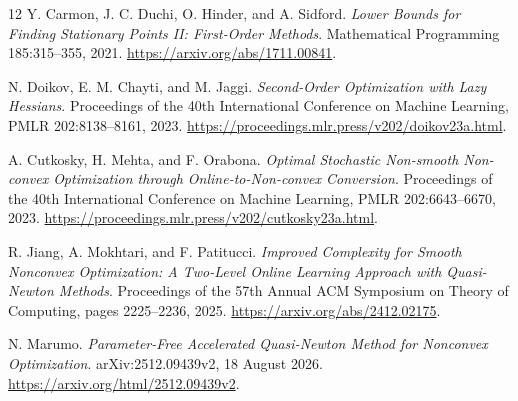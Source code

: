 \documentclass[11pt]{article}
\theoremstyle{remark}
\theoremstyle{remark}
\begin{document}
\begin{thebibliography}{12}
Y. Carmon, J. C. Duchi, O. Hinder, and A. Sidford.
\emph{Lower Bounds for Finding Stationary Points II: First-Order Methods}.
Mathematical Programming 185:315--355, 2021.
\url{https://arxiv.org/abs/1711.00841}.

N. Doikov, E. M. Chayti, and M. Jaggi.
\emph{Second-Order Optimization with Lazy Hessians}.
Proceedings of the 40th International Conference on Machine Learning,
PMLR 202:8138--8161, 2023.
\url{https://proceedings.mlr.press/v202/doikov23a.html}.

A. Cutkosky, H. Mehta, and F. Orabona.
\emph{Optimal Stochastic Non-smooth Non-convex Optimization through Online-to-Non-convex Conversion}.
Proceedings of the 40th International Conference on Machine Learning,
PMLR 202:6643--6670, 2023.
\url{https://proceedings.mlr.press/v202/cutkosky23a.html}.

R. Jiang, A. Mokhtari, and F. Patitucci.
\emph{Improved Complexity for Smooth Nonconvex Optimization: A Two-Level Online Learning Approach with Quasi-Newton Methods}.
Proceedings of the 57th Annual ACM Symposium on Theory of Computing,
pages 2225--2236, 2025.
\url{https://arxiv.org/abs/2412.02175}.

N. Marumo.
\emph{Parameter-Free Accelerated Quasi-Newton Method for Nonconvex Optimization}.
arXiv:2512.09439v2, 18 August 2026.
\url{https://arxiv.org/html/2512.09439v2}.
\end{thebibliography}
\end{document}

